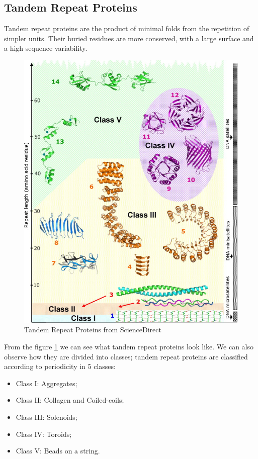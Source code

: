 \vspace{10em}

\subsection{Tandem Repeat Proteins}
Tandem repeat proteins are the product of minimal folds from the repetition of simpler units. Their buried residues are more conserved, with a large surface and a high sequence variability.

\begin{figure}[h!]
	\includegraphics[scale=0.6]{res/proteins_overview/tandem.jpg}
	\centering
	\caption{Tandem Repeat Proteins from ScienceDirect \cite{tandem}}
	\label{fig:tandem}
\end{figure}

From the figure \ref{fig:tandem} we can see what tandem repeat proteins look like. We can also observe how they are divided into classes; tandem repeat proteins are classified according to periodicity in 5 classes:
\begin{itemize}
	\item Class I: Aggregates;
	\item Class II: Collagen and Coiled-coils;
	\item Class III: Solenoids;
	\item Class IV: Toroids;
	\item Class V: Beads on a string.
\end{itemize}

